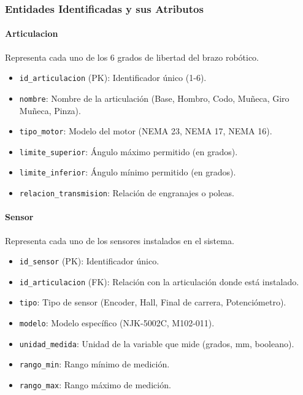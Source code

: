 \documentclass[11pt]{article}
\begin{document}
\subsubsection{Entidades Identificadas y sus Atributos}

\paragraph{Articulacion}
Representa cada uno de los 6 grados de libertad del brazo robótico.

\begin{itemize}
	\item \texttt{id\_articulacion} (PK): Identificador único (1-6).
	\item \texttt{nombre}: Nombre de la articulación (Base, Hombro, Codo, Muñeca, Giro Muñeca, Pinza).
	\item \texttt{tipo\_motor}: Modelo del motor (NEMA 23, NEMA 17, NEMA 16).
	\item \texttt{limite\_superior}: Ángulo máximo permitido (en grados).
	\item \texttt{limite\_inferior}: Ángulo mínimo permitido (en grados).
	\item \texttt{relacion\_transmision}: Relación de engranajes o poleas.
\end{itemize}

\paragraph{Sensor}
Representa cada uno de los sensores instalados en el sistema.

\begin{itemize}
	\item \texttt{id\_sensor} (PK): Identificador único.
	\item \texttt{id\_articulacion} (FK): Relación con la articulación donde está instalado.
	\item \texttt{tipo}: Tipo de sensor (Encoder, Hall, Final de carrera, Potenciómetro).
	\item \texttt{modelo}: Modelo específico (NJK-5002C, M102-011).
	\item \texttt{unidad\_medida}: Unidad de la variable que mide (grados, mm, booleano).
	\item \texttt{rango\_min}: Rango mínimo de medición.
	\item \texttt{rango\_max}: Rango máximo de medición.
\end{itemize}
\end{document}
